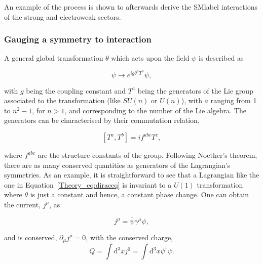 An example of the process is shown to afterwards derive the \acrshort{SMlabel} interactions of the strong and electroweak sectors. 

\subsubsection{Gauging a symmetry to interaction}

A general global transformation $\theta$ which acts upon the field $\psi$ is described as

\begin{equation}
    \psi\rightarrow e^{ig\theta^aT^a}\psi,
\end{equation}

with $g$ being the coupling constant and $T^a$ being the generators of the Lie group associated to the transformation (like $SU(n)$ or $U(n)$), with $a$ ranging from 1 to $n^2-1$, for $n>1$, and corresponding to the number of the Lie algebra.
The generators can be characterised by their commutation relation, 

\begin{equation}
\label{Theory_eq:nonabcomutator}
    [T^a,T^b]=if^{abc}T^c,
\end{equation}

where $f^{abc}$ are the structure constants of the group. Following Noether's theorem, there are as many conserved quantities as generators of the Lagrangian's symmetries. As an example, it is straightforward to see that a Lagrangian like the one in
Equation~\ref{Theory_eq:diraceq} is invariant to a $U(1)$ transformation where $\theta$ is just a constant and hence, a constant phase change.
One can obtain the current, $j^\mu$, as

\begin{equation}
    j^\mu = \bar{\psi}\gamma^\mu\psi,
\end{equation}

and is conserved, $\partial_\mu j^\mu = 0$, with the conserved charge,
\begin{equation}
Q=\int \mathrm{d}^3x j^0 = \int \mathrm{d}^3x\psi^{\dag}\psi. %
\end{equation}



